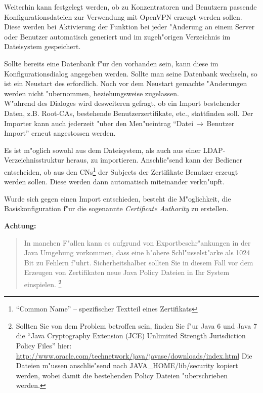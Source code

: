 %
Weiterhin kann festgelegt werden, ob zu Konzentratoren und Benutzern
passende Konfigurationsdateien zur Verwendung mit OpenVPN erzeugt werden sollen.
Diese werden bei Aktivierung der Funktion bei jeder "Anderung an einem Server
oder Benutzer automatisch generiert und im zugeh"origen Verzeichnis im 
Dateisystem gespeichert.



\nl Sollte bereits eine Datenbank f"ur den \Nbm{} vorhanden sein,
kann diese im
Konfigurationsdialog angegeben werden. Sollte man seine Datenbank wechseln,
so ist ein Neustart des \Nbm{} erfordlich. Noch vor dem Neustart gemachte
"Anderungen werden nicht "ubernommen, beziehungsweise zugelassen.\\
W"ahrend des Dialoges wird
desweiteren gefragt, ob ein Import bestehender Daten, z.B.
 Root-CAs, bestehende Benutzerzertifikate, etc., stattfinden soll.
Der Importer
kann auch jederzeit "uber den Men"ueintrag ``Datei$\,\rightarrow\,$Benutzer Import''
erneut angestossen werden.

\nl Es ist m"oglich sowohl aus dem Dateisystem, als auch aus einer
LDAP-Verzeichnisstruktur heraus, zu importieren.
%
Anschlie"send kann der Bediener entscheiden, ob aus den CNs\footnote{%
\sffamily ``Common Name'' -- spezifischer Textteil eines Zertifikats}
der Subjects der Zertifikate Benutzer erzeugt werden sollen.
Diese werden dann automatisch miteinander verkn"upft.


\nl Wurde sich gegen einen Import entschieden, besteht die M"oglichkeit, die
Basiskonfiguration f"ur die sogenannte \emph{Certificate Authority} zu erstellen.

\nl\textbf{Achtung: }\begin{quote}In manchen F"allen kann es aufgrund von
Exportbeschr"ankungen in der Java Umgebung vorkommen, dass eine h"ohere
Schl"usselst"arke als 1024 Bit zu Fehlern f"uhrt.  Sicherheitshalber
sollten Sie in diesem Fall vor dem Erzeugen von Zertifikaten neue Java
Policy Dateien in Ihr System einspielen.  \footnote{Sollten Sie von dem
Problem betroffen sein, finden Sie f"ur Java 6 und Java 7 die ``Java Cryptography Extension (JCE)
Unlimited Strength Jurisdiction Policy Files''  hier:
\url{http://www.oracle.com/technetwork/java/javase/downloads/index.html} Die
Dateien m"ussen anschlie"send nach JAVA\_HOME/lib/security kopiert werden,
wobei damit die bestehenden Policy Dateien "uberschrieben werden.}
\end{quote}

\newpage

